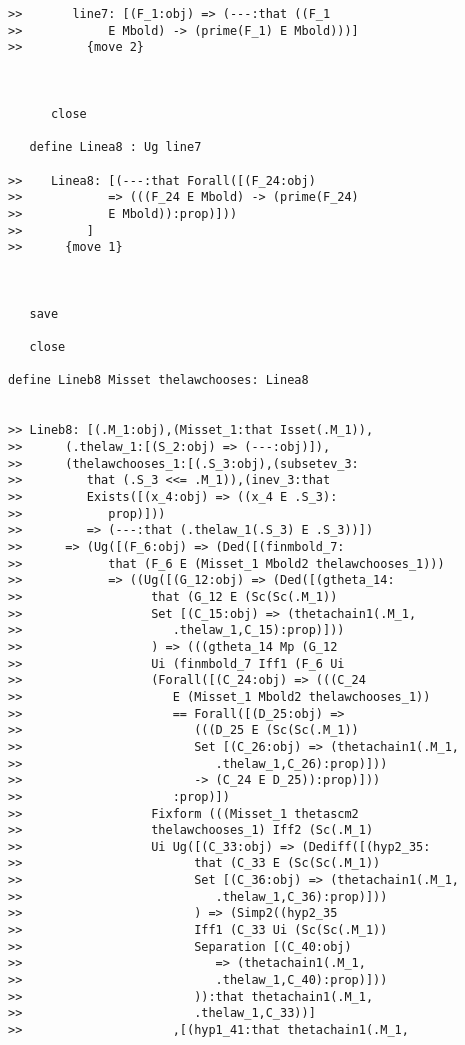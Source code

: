 \documentclass[12pt]{article}
\begin{document}
\begin{verbatim}
>>       line7: [(F_1:obj) => (---:that ((F_1
>>            E Mbold) -> (prime(F_1) E Mbold)))]
>>         {move 2}



      close

   define Linea8 : Ug line7

>>    Linea8: [(---:that Forall([(F_24:obj)
>>            => (((F_24 E Mbold) -> (prime(F_24)
>>            E Mbold)):prop)]))
>>         ]
>>      {move 1}



   save

   close

define Lineb8 Misset thelawchooses: Linea8


>> Lineb8: [(.M_1:obj),(Misset_1:that Isset(.M_1)),
>>      (.thelaw_1:[(S_2:obj) => (---:obj)]),
>>      (thelawchooses_1:[(.S_3:obj),(subsetev_3:
>>         that (.S_3 <<= .M_1)),(inev_3:that
>>         Exists([(x_4:obj) => ((x_4 E .S_3):
>>            prop)]))
>>         => (---:that (.thelaw_1(.S_3) E .S_3))])
>>      => (Ug([(F_6:obj) => (Ded([(finmbold_7:
>>            that (F_6 E (Misset_1 Mbold2 thelawchooses_1)))
>>            => ((Ug([(G_12:obj) => (Ded([(gtheta_14:
>>                  that (G_12 E (Sc(Sc(.M_1))
>>                  Set [(C_15:obj) => (thetachain1(.M_1,
>>                     .thelaw_1,C_15):prop)]))
>>                  ) => (((gtheta_14 Mp (G_12
>>                  Ui (finmbold_7 Iff1 (F_6 Ui
>>                  (Forall([(C_24:obj) => (((C_24
>>                     E (Misset_1 Mbold2 thelawchooses_1))
>>                     == Forall([(D_25:obj) =>
>>                        (((D_25 E (Sc(Sc(.M_1))
>>                        Set [(C_26:obj) => (thetachain1(.M_1,
>>                           .thelaw_1,C_26):prop)]))
>>                        -> (C_24 E D_25)):prop)]))
>>                     :prop)])
>>                  Fixform (((Misset_1 thetascm2
>>                  thelawchooses_1) Iff2 (Sc(.M_1)
>>                  Ui Ug([(C_33:obj) => (Dediff([(hyp2_35:
>>                        that (C_33 E (Sc(Sc(.M_1))
>>                        Set [(C_36:obj) => (thetachain1(.M_1,
>>                           .thelaw_1,C_36):prop)]))
>>                        ) => (Simp2((hyp2_35
>>                        Iff1 (C_33 Ui (Sc(Sc(.M_1))
>>                        Separation [(C_40:obj)
>>                           => (thetachain1(.M_1,
>>                           .thelaw_1,C_40):prop)]))
>>                        )):that thetachain1(.M_1,
>>                        .thelaw_1,C_33))]
>>                     ,[(hyp1_41:that thetachain1(.M_1,

\end{verbatim}
\end{document}
